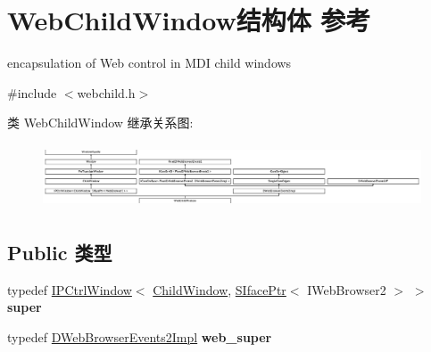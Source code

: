 \hypertarget{struct_web_child_window}{}\section{Web\+Child\+Window结构体 参考}
\label{struct_web_child_window}


encapsulation of Web control in M\+DI child windows  




{\ttfamily \#include $<$webchild.\+h$>$}

类 Web\+Child\+Window 继承关系图\+:\begin{figure}[H]
\begin{center}
\leavevmode
\includegraphics[height=1.935484cm]{struct_web_child_window}
\end{center}
\end{figure}
\subsection*{Public 类型}
\begin{DoxyCompactItemize}
\item 
\mbox{\label{struct_web_child_window_a0ee1c4584149fc197b631ea9cd7119df}} 
typedef \hyperlink{struct_i_p_ctrl_window}{I\+P\+Ctrl\+Window}$<$ \hyperlink{struct_child_window}{Child\+Window}, \hyperlink{struct_s_iface_ptr}{S\+Iface\+Ptr}$<$ I\+Web\+Browser2 $>$ $>$ {\bfseries super}
\item 
\mbox{\label{struct_web_child_window_a752f6022c4d943d067d8c731970b28c2}} 
typedef \hyperlink{struct_d_web_browser_events2_impl}{D\+Web\+Browser\+Events2\+Impl} {\bfseries web\+\_\+super}
\end{DoxyCompactItemize}
